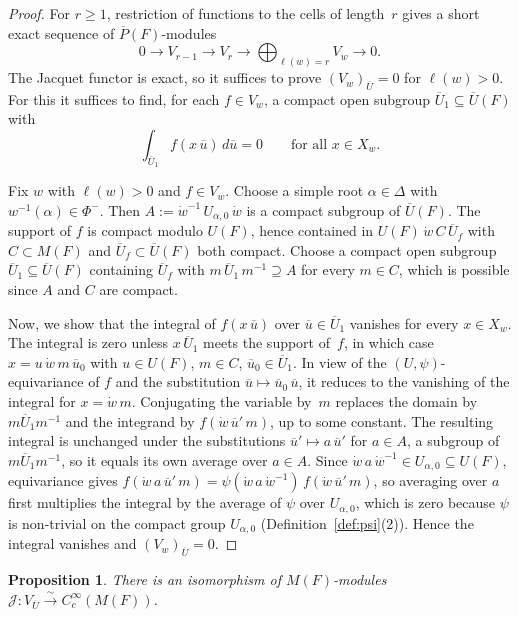 \documentclass[11pt]{amsart}
\newtheorem{proposition}[theorem]{Proposition}
\theoremstyle{definition}
\theoremstyle{remark}
\newcommand{\barr}[1]{\overline{#1}}
\begin{document}
\begin{proof}
For $r \ge 1$, restriction of functions to the cells of length~$r$ gives a short exact sequence of $\barr{P}(F)$-modules
\[
0 \to V_{r-1} \to V_r \to \bigoplus_{\ell(w)=r} V_w \to 0.
\]
The Jacquet functor is exact, so it suffices to prove $(V_w)_{\barr{U}} = 0$ for $\ell(w) > 0$. For this it suffices to find, for each $f \in V_w$, a compact open subgroup $\barr{U}_1 \subseteq \barr{U}(F)$ with
\[
\int_{\barr{U}_1} f(x\,\barr{u})\,d\barr{u} = 0 \qquad\text{for all } x \in X_w.
\]

Fix $w$ with $\ell(w) > 0$ and $f \in V_w$. Choose a simple root $\alpha \in \Delta$ with $w^{-1}(\alpha) \in \Phi^-$. Then $A := \dot{w}^{-1}\,U_{\alpha,0}\,\dot{w}$ is a compact subgroup of $\barr{U}(F)$. The support of $f$ is compact modulo $U(F)$, hence contained in $U(F)\,\dot{w}\,C\,\barr{U}_f$ with $C \subset M(F)$ and $\barr{U}_f \subset \barr{U}(F)$ both compact. Choose a compact open subgroup $\barr{U}_1 \subseteq \barr{U}(F)$ containing $\barr{U}_f$ with $m\,\barr{U}_1\,m^{-1} \supseteq A$ for every $m \in C$, which is possible since $A$ and $C$ are compact.

Now, we show that the integral of $f(x\,\barr{u})$ over $\barr{u}\in\barr{U}_1$ vanishes for every $x \in X_w$. The integral is zero unless $x\,\barr{U}_1$ meets the support of~$f$, in which case $x = u\,\dot{w}\,m\,\barr{u}_0$ with $u \in U(F)$, $m \in C$, $\barr{u}_0 \in \barr{U}_1$. In view of the $(U,\psi)$-equivariance of $f$ and the substitution $\barr{u} \mapsto \barr{u}_0\,\barr{u}$, it reduces to the vanishing of the integral for $x = \dot{w}\,m$. Conjugating the variable by~$m$ replaces the domain by $m\barr{U}_1 m^{-1}$ and the integrand by $f(\dot{w}\,\barr{u}'\,m)$, up to some constant. The resulting integral is unchanged under the substitutions $\barr{u}' \mapsto a\,\barr{u}'$ for $a \in A$, a subgroup of $m\barr{U}_1 m^{-1}$, so it equals its own average over $a \in A$. Since $\dot{w}\,a\,\dot{w}^{-1} \in U_{\alpha,0} \subseteq U(F)$, equivariance gives $f(\dot{w}\,a\,\barr{u}'\,m) = \psi(\dot{w}\,a\,\dot{w}^{-1})\,f(\dot{w}\,\barr{u}'\,m)$, so averaging over $a$ first multiplies the integral by the average of $\psi$ over $U_{\alpha,0}$, which is zero because $\psi$ is non-trivial on the compact group $U_{\alpha,0}$ (Definition~\ref{def:psi}(2)). Hence the integral vanishes and $(V_w)_{\barr{U}} = 0$.
\end{proof}

\begin{proposition}\label{prop:Jacquet}
There is an isomorphism of $M(F)$-modules $\mathcal{J} \colon V_{\barr{U}} \xrightarrow{\sim} C_c^\infty(M(F))$.
\end{proposition}
\end{document}
